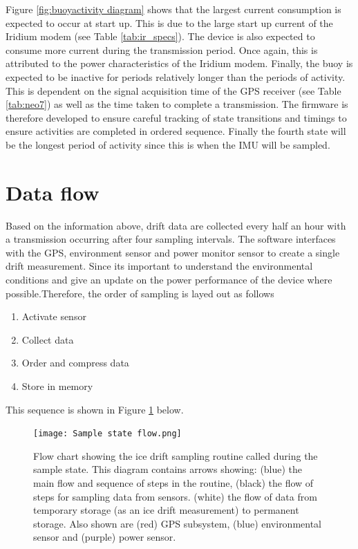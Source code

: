 Figure \ref{fig:buoyactivity diagram} shows that the largest current consumption is expected to occur at start up. This is due to the large start up current of the Iridium modem (see Table \ref{tab:ir_specs}). The device is also expected to consume more current during the transmission period. Once again, this is attributed to the power characteristics of the Iridium modem. Finally, the buoy is expected to be inactive for periods relatively longer than the periods of activity. This is dependent on the signal acquisition time of the GPS receiver (see Table \ref{tab:neo7}) as well as the time taken to complete a transmission. The firmware is therefore developed to ensure careful tracking of state transitions and timings to ensure activities are completed in ordered sequence. Finally the fourth state will be the longest period of activity since this is when the IMU will be sampled.
\section{Data flow}
\label{sec:data_flow}

Based on the information above, drift data are collected every half an hour with a transmission occurring after four sampling intervals. The software interfaces with the GPS, environment sensor and power monitor sensor to create a single drift measurement. Since its important to understand the environmental conditions and give an update on the power performance of the device where possible.Therefore, the order of sampling is layed out as follows

\begin{enumerate}
	\item Activate sensor
	\item Collect data
	\item Order and compress data
	\item Store in memory
\end{enumerate}

This sequence is shown in Figure \ref{fig:sampleflow} below.

\begin{figure}[H]
	\centering
	\texttt{[image: Sample state flow.png]}
	\caption{Flow chart showing the ice drift sampling routine called during the sample state. This diagram contains arrows showing: (blue) the main flow and sequence of steps in the routine, (black) the flow of steps for sampling data from sensors. (white) the flow of data from temporary storage (as an ice drift measurement) to permanent storage. Also shown are (red) GPS subsystem, (blue) environmental sensor and (purple) power sensor.}
	\label{fig:sampleflow}
\end{figure}

